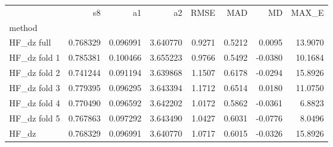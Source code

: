 \begin{tabular}{lrrrrrrr}
 & s8 & a1 & a2 & RMSE & MAD & MD & MAX_E \\
method &  &  &  &  &  &  &  \\
HF_dz full & 0.768329 & 0.096991 & 3.640770 & 0.9271 & 0.5212 & 0.0095 & 13.9070 \\
HF_dz fold 1 & 0.785381 & 0.100466 & 3.655223 & 0.9766 & 0.5492 & -0.0380 & 10.1684 \\
HF_dz fold 2 & 0.741244 & 0.091194 & 3.639868 & 1.1507 & 0.6178 & -0.0294 & 15.8926 \\
HF_dz fold 3 & 0.779395 & 0.096295 & 3.643394 & 1.1712 & 0.6514 & 0.0180 & 11.0750 \\
HF_dz fold 4 & 0.770490 & 0.096592 & 3.642202 & 1.0172 & 0.5862 & -0.0361 & 6.8823 \\
HF_dz fold 5 & 0.767863 & 0.097292 & 3.643490 & 1.0427 & 0.6031 & -0.0776 & 8.0496 \\
HF_dz & 0.768329 & 0.096991 & 3.640770 & 1.0717 & 0.6015 & -0.0326 & 15.8926 \\
\end{tabular}
